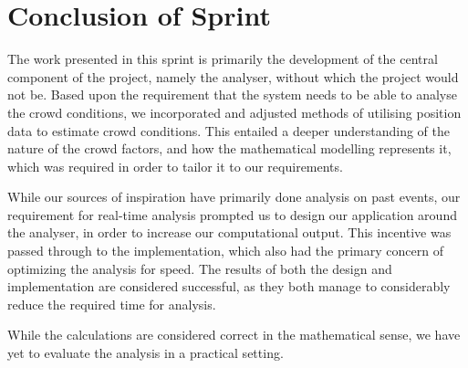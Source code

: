 \section{Conclusion of Sprint}
The work presented in this sprint is primarily the development of the central component of the project, namely the analyser, without which the project would not be. Based upon the requirement that the system needs to be able to analyse the crowd conditions, we incorporated and adjusted methods of utilising position data to estimate crowd conditions. This entailed a deeper understanding of the nature of the crowd factors, and how the mathematical modelling represents it, which was required in order to tailor it to our requirements.

While our sources of inspiration have primarily done analysis on past events, our requirement for real-time analysis prompted us to design our application around the analyser, in order to increase our computational output. This incentive was passed through to the implementation, which also had the primary concern of optimizing the analysis for speed. The results of both the design and implementation are considered successful, as they both manage to considerably reduce the required time for analysis.

While the calculations are considered correct in the mathematical sense, we have yet to evaluate the analysis in a practical setting.